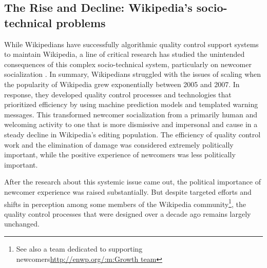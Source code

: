 \subsection{The Rise and Decline: Wikipedia's socio-technical problems}
While Wikipedians have successfully algorithmic quality control support systems to maintain Wikipedia, a line of critical research has studied the unintended consequences of this complex socio-technical system, particularly on newcomer socialization \cite{halfaker2013rise,morgan2013tea,halfaker2014snuggle}.  In summary, Wikipedians struggled with the issues of scaling when the popularity of Wikipedia grew exponentially between 2005 and 2007\cite{halfaker2013rise}.  In response, they developed quality control processes and technologies that prioritized efficiency by using machine prediction models\cite{halfaker2014snuggle} and templated warning messages\cite{halfaker2013rise}.  This transformed newcomer socialization from a primarily human and welcoming activity to one that is more dismissive and impersonal\cite{morgan2013tea} and cause in a steady decline in Wikipedia's editing population.  The efficiency of quality control work and the elimination of damage was considered extremely politically important, while the positive experience of newcomers was less politically important.

After the research about this systemic issue came out, the political importance of newcomer experience was raised substantially.  But despite targeted efforts and shifts in perception among some members of the Wikipedia community\cite{narayan2015effects, morgan2013tea}\footnote{See also a team dedicated to supporting newcomers\url{http://enwp.org/:m:Growth team}}, the quality control processes that were designed over a decade ago remains largely unchanged\cite{halfaker2014snuggle}.
